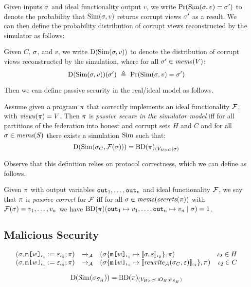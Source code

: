 Given inputs $\sigma$ and ideal
functionality output $v$, we write $ \mathrm{Pr}(\mathrm{Sim}(\sigma,v) = \sigma') $
to denote the probability that $\mathrm{Sim}(\sigma,v)$ returns corrupt views
$\sigma'$ as a result. We can then define the probability distribution
of corrupt views reconstructed by the simulator as follows:
\begin{definition}
  Given $C$, $\sigma$, and $v$, we write $\mathrm{D}(\mathrm{Sim}(\sigma,v))$ to
  denote the distribution of corrupt views reconstructed by the
  simulation, where for
  all $\sigma' \in \mathit{mems}(V)$:
  $$
  \dist(\SIM(\store,v))(\store')\ \defeq\ \prob(\SIM(\store,v) = \store') 
  $$
\end{definition}
Then we can define passive security in the real/ideal
model as follows. 
\begin{definition}
  Assume given a program $\pi$ that correctly implements an ideal
  functionality $\mathcal{F}$, with $\mathit{views}(\pi) = V$.  Then $\pi$
  is \emph{passive secure in the simulator model} iff for all
  partitions of the federation into honest and corrupt sets $H$ and $C$
  and for all $\sigma \in \mathit{mems}(S)$ there exists a
  simulation $\mathrm{Sim}$ such that:
  $$
  \mathrm{D}(\mathrm{Sim}(\sigma_{C},\mathcal{F}(\sigma))) = \mathrm{BD}(\pi)_{({V_{H \rhd C}}|{\sigma})}
  $$
\end{definition}
Observe that this definition relies on protocol correctness, which
we can define as follows.
\begin{definition}
  Given $\pi$ with output variables $\texttt{out}_{1},\ldots,\texttt{out}_{n}$ and ideal
  functionality $\mathcal{F}$, we say that $\pi$ is \emph{passive correct}
  for $\mathcal{F}$ iff for all $\sigma \in \mathit{mems}(\mathit{secrets}(\pi))$
  with $\mathcal{F}(\sigma) = v_1,\ldots,v_n$ we have
  $\mathrm{BD}(\pi)(\texttt{out}_{1} \mapsto v_1,\ldots,\texttt{out}_{n} \mapsto v_n \mid \sigma) = 1$.
\end{definition}

\subsection{Malicious Security}

$$
\begin{array}{rclr}
  (\sigma, \texttt{m[}w\texttt{]}_{\iota_1} := \varepsilon_{\iota_2};\pi) &\xrightarrow{}_{\mathcal{A}}&
  (\sigma\{\texttt{m[}w\texttt{]}_{\iota_1} \mapsto \llbracket \sigma,\varepsilon \rrbracket_{\iota_2}\}, \pi) & \iota_2 \in H\\
  (\sigma, \texttt{m[}w\texttt{]}_{\iota_1} := \varepsilon_{\iota_2};\pi) &\xrightarrow{}_{\mathcal{A}}&
  (\sigma\{\texttt{m[}w\texttt{]}_{\iota_1} \mapsto \llbracket \mathit{rewrite}_{\mathcal{A}}(\sigma_C,\varepsilon) \rrbracket_{\iota_2}\}, \pi) & \iota_2 \in C
\end{array}
$$


$$
\mathrm{D}(\mathrm{Sim}(\sigma_{S_H})) = \mathrm{BD}(\pi)_{({V_{H \rhd C} \cup O_H}|{\sigma_{S_H}})}
$$
